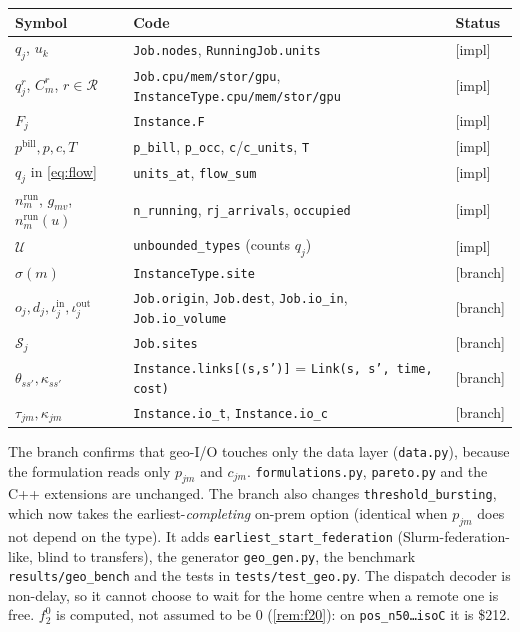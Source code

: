 \documentclass[11pt,a4paper]{article}
\newcommand{\U}{\mathcal{U}}
\newcommand{\Sites}{\mathcal{S}}
\newcommand{\Res}{\mathcal{R}}
\newcommand{\code}[1]{\texttt{#1}}
\newcommand{\pin}{\mathrm{in}}
\newcommand{\pout}{\mathrm{out}}
\newcommand{\bill}{\mathrm{bill}}
\newcommand{\run}{\mathrm{run}}
\newcommand{\status}[1]{\textsf{\small[#1]}}
\begin{document}
\begin{center}
\renewcommand{\arraystretch}{1.1}
\begin{longtable}{@{}p{3.4cm}p{6.2cm}p{3.6cm}@{}}
\toprule
Symbol & Code & Status \\
\midrule
\endhead
$q_j$, $u_k$ & \code{Job.nodes}, \code{RunningJob.units} & \status{impl} \\
$q^r_j$, $C^r_m$, $r\in\Res$ & \code{Job.cpu/mem/stor/gpu}, \code{InstanceType.cpu/mem/stor/gpu} & \status{impl} \\
$F_j$ & \code{Instance.F} & \status{impl} \\
$p^\bill,p,c,T$ & \code{p\_bill}, \code{p\_occ}, \code{c}/\code{c\_units}, \code{T} & \status{impl} \\
$q_j$ in \eqref{eq:flow} & \code{units\_at}, \code{flow\_sum} & \status{impl} \\
$n^\run_m$, $g_{mv}$, $n^\run_m(u)$ & \code{n\_running}, \code{rj\_arrivals}, \code{occupied} & \status{impl} \\
$\U$ & \code{unbounded\_types} (counts $q_j$) & \status{impl} \\
$\sigma(m)$ & \code{InstanceType.site} & \status{branch} \\
$o_j,d_j,\iota^\pin_j,\iota^\pout_j$ & \code{Job.origin}, \code{Job.dest}, \code{Job.io\_in}, \code{Job.io\_volume} & \status{branch} \\
$\Sites_j$ & \code{Job.sites} & \status{branch} \\
$\theta_{ss'},\kappa_{ss'}$ & \code{Instance.links[(s,s')]} = \code{Link(s, s', time, cost)} & \status{branch} \\
$\tau_{jm},\kappa_{jm}$ & \code{Instance.io\_t}, \code{Instance.io\_c} & \status{branch} \\
\bottomrule
\end{longtable}
\end{center}

\noindent The branch confirms that geo-I/O touches only the data layer
(\code{data.py}), because the formulation reads only $p_{jm}$ and $c_{jm}$.
\code{formulations.py}, \code{pareto.py} and the C++ extensions are unchanged.
The branch also changes \code{threshold\_bursting}, which now takes the
earliest-\emph{completing} on-prem option (identical when $p_{jm}$ does not depend
on the type). It adds \code{earliest\_start\_federation} (Slurm-federation-like,
blind to transfers), the generator \code{geo\_gen.py}, the benchmark
\code{results/geo\_bench} and the tests in \code{tests/test\_geo.py}. The
dispatch decoder is non-delay, so it cannot choose to wait for the home centre
when a remote one is free. $f_2^0$ is computed, not assumed to be $0$
(\cref{rem:f20}): on \code{pos\_n50\dots isoC} it is \$212.
\end{document}
